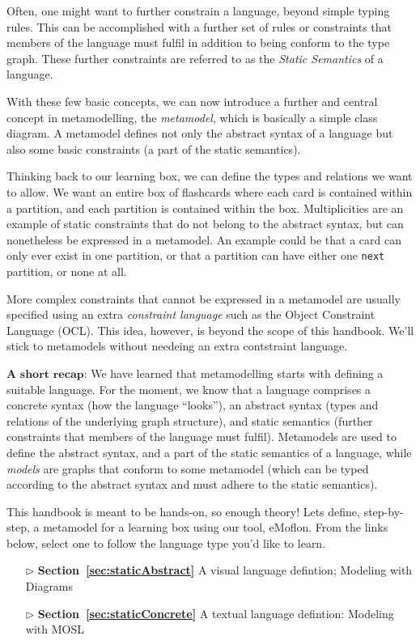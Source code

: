 Often, one might want to further constrain a language, beyond simple typing rules.
This can be accomplished with a further set of rules or constraints that members of the language must fulfil in addition to being conform to the type graph.
These further constraints are referred to as the \emph{Static Semantics} of a language.

With these few basic concepts, we can now introduce a further and central concept in metamodelling, the \emph{metamodel}, which is basically a simple class diagram. 
A metamodel defines not only the abstract syntax of a language but also some basic constraints (a part of the static semantics).

Thinking back to our learning box, we can define the types and relations we want to allow. We want an entire box of flashcards where each card is contained within a partition, and each partition is contained within the box. Multiplicities are an example of static constraints that do not belong to the abstract syntax, but can nonetheless be expressed in a metamodel.
An example could be that a card can only ever exist in one partition, or that a partition can have either one \texttt{next} partition, or none at all.

\pagebreak
More complex constraints that cannot be expressed in a metamodel are usually specified using an extra \emph{constraint language} such as the Object Constraint Language (OCL). This idea, however,  is beyond the scope of this handbook. We'll stick to metamodels without needeing an extra contstraint language. 

$\textbf{A short recap:}$  
We have learned that metamodelling starts with defining a suitable language.
For the moment, we know that a language comprises a concrete syntax (how the language ``looks''),  an abstract syntax (types and relations of the underlying graph structure), and static semantics (further constraints that members of the language must fulfil).
Metamodels are used to define the abstract syntax, and a part of the static semantics of a language, while \emph{models} are graphs that conform to some
metamodel (which can be typed according to the abstract syntax and must adhere to the static semantics).

This handbook is meant to be hands-on, so enough theory!
Lets define, step-by-step, a metamodel for a learning box using our tool, eMoflon. From the links below, select one to follow the language type you'd like to learn.

\vspace{1cm}

\begin{itemize}
  \item[$\triangleright$] {\bf Section~\ref{sec:staticAbstract}} A visual language defintion; Modeling with Diagrams
  \item[$\triangleright$] {\bf Section~\ref{sec:staticConcrete}} A textual language defintion: Modeling with MOSL
\end{itemize}